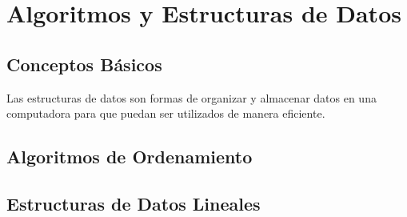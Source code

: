 \chapter{Algoritmos y Estructuras de Datos}
\section{Conceptos Básicos}
Las estructuras de datos son formas de organizar y almacenar datos en una computadora para que puedan ser utilizados de manera eficiente.

\section{Algoritmos de Ordenamiento}

\section{Estructuras de Datos Lineales}

